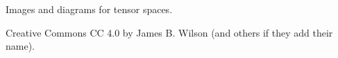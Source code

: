 \documentclass{beamer}
\begin{document}
\begin{frame}

Images and diagrams for tensor spaces.

Creative Commons CC 4.0 by James B. Wilson (and others if they add their name).
\end{frame}






\end{document}
